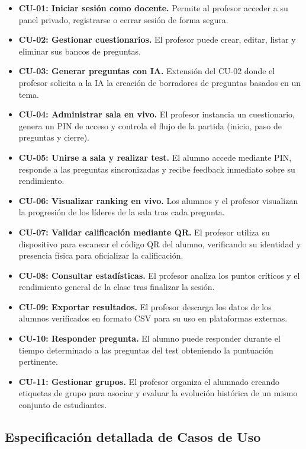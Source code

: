 \begin{itemize}
    \item \textbf{CU-01: Iniciar sesión como docente.} Permite al profesor acceder a su panel privado, registrarse o cerrar sesión de forma segura.
    \item \textbf{CU-02: Gestionar cuestionarios.} El profesor puede crear, editar, listar y eliminar sus bancos de preguntas.
    \item \textbf{CU-03: Generar preguntas con IA.} Extensión del CU-02 donde el profesor solicita a la IA la creación de borradores de preguntas basados en un tema.
    \item \textbf{CU-04: Administrar sala en vivo.} El profesor instancia un cuestionario, genera un PIN de acceso y controla el flujo de la partida (inicio, paso de preguntas y cierre).
    \item \textbf{CU-05: Unirse a sala y realizar test.} El alumno accede mediante PIN, responde a las preguntas sincronizadas y recibe feedback inmediato sobre su rendimiento.
    \item \textbf{CU-06: Visualizar ranking en vivo.} Los alumnos y el profesor visualizan la progresión de los líderes de la sala tras cada pregunta.
    \item \textbf{CU-07: Validar calificación mediante QR.} El profesor utiliza su dispositivo para escanear el código QR del alumno, verificando su identidad y presencia física para oficializar la calificación.
    \item \textbf{CU-08: Consultar estadísticas.} El profesor analiza los puntos críticos y el rendimiento general de la clase tras finalizar la sesión.
    \item \textbf{CU-09: Exportar resultados.} El profesor descarga los datos de los alumnos verificados en formato CSV para su uso en plataformas externas.
    \item \textbf{CU-10: Responder pregunta.} El alumno puede responder durante el tiempo determinado a las preguntas del test obteniendo la puntuación pertinente.
    \item \textbf{CU-11: Gestionar grupos.} El profesor organiza el alumnado creando etiquetas de grupo para asociar y evaluar la evolución histórica de un mismo conjunto de estudiantes.
\end{itemize}

\subsection{Especificación detallada de Casos de Uso}\label{sub:especificacion_casos_de_uso}

